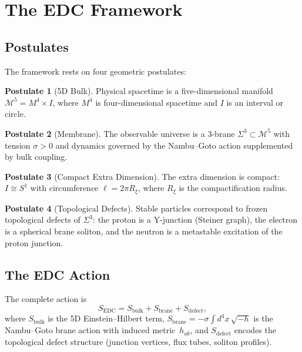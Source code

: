 \documentclass[12pt,a4paper]{article}
\theoremstyle{definition}
\newtheorem{postulate}{Postulate}
\theoremstyle{remark}
\begin{document}
\section{The EDC Framework}
\label{sec:framework}

\subsection{Postulates}

The framework rests on four geometric postulates:

\begin{postulate}[5D Bulk]
\label{post:5D}
Physical spacetime is a five-dimensional manifold
$\mathcal{M}^5 = M^4 \times I$, where $M^4$ is four-dimensional
spacetime and $I$ is an interval or circle.
\end{postulate}

\begin{postulate}[Membrane]
\label{post:membrane}
The observable universe is a 3-brane $\Sigma^3 \subset \mathcal{M}^5$
with tension $\sigma > 0$ and dynamics governed by the Nambu--Goto
action supplemented by bulk coupling.
\end{postulate}

\begin{postulate}[Compact Extra Dimension]
\label{post:compact}
The extra dimension is compact: $I \cong S^1$ with circumference
$\ell = 2\pi R_\xi$, where $R_\xi$ is the compactification radius.
\end{postulate}

\begin{postulate}[Topological Defects]
\label{post:defects}
Stable particles correspond to frozen topological defects of
$\Sigma^3$: the proton is a Y-junction (Steiner graph), the electron
is a spherical brane soliton, and the neutron is a metastable
excitation of the proton junction.
\end{postulate}

\subsection{The EDC Action}

The complete action is
\begin{equation}
  S_{\mathrm{EDC}} = S_{\mathrm{bulk}} + S_{\mathrm{brane}}
    + S_{\mathrm{defect}},
  \label{eq:action}
\end{equation}
where $S_{\mathrm{bulk}}$ is the 5D Einstein--Hilbert term,
$S_{\mathrm{brane}} = -\sigma \int d^4x\,\sqrt{-h}$ is the
Nambu--Goto brane action with induced metric~$h_{ab}$, and
$S_{\mathrm{defect}}$ encodes the topological defect structure
(junction vertices, flux tubes, soliton profiles).
\end{document}
